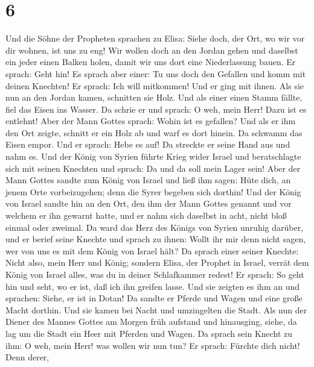 \hypertarget{section-5}{%
\section{6}\label{section-5}}

 Und die Söhne der Propheten sprachen zu Elisa: Siehe
doch, der Ort, wo wir vor dir wohnen, ist uns zu eng!  Wir
wollen doch an den Jordan gehen und daselbst ein jeder einen Balken
holen, damit wir uns dort eine Niederlassung bauen.  Er
sprach: Geht hin! Es sprach aber einer: Tu uns doch den Gefallen und
komm mit deinen Knechten!  Er sprach: Ich will mitkommen!
Und er ging mit ihnen. Als sie nun an den Jordan kamen, schnitten sie
Holz.  Und als einer einen Stamm fällte, fiel das Eisen
ins Wasser. Da schrie er und sprach: O weh, mein Herr! Dazu ist es
entlehnt!  Aber der Mann Gottes sprach: Wohin ist es
gefallen? Und als er ihm den Ort zeigte, schnitt er ein Holz ab und warf
es dort hinein. Da schwamm das Eisen empor.  Und er
sprach: Hebe es auf! Da streckte er seine Hand aus und nahm es.
 Und der König von Syrien führte Krieg wider Israel und
beratschlagte sich mit seinen Knechten und sprach: Da und da soll mein
Lager sein!  Aber der Mann Gottes sandte zum König von
Israel und ließ ihm sagen: Hüte dich, an jenem Orte vorbeizugehen; denn
die Syrer begeben sich dorthin!  Und der König von Israel
sandte hin an den Ort, den ihm der Mann Gottes genannt und vor welchem
er ihn gewarnt hatte, und er nahm sich daselbst in acht, nicht bloß
einmal oder zweimal.  Da ward das Herz des Königs von
Syrien unruhig darüber, und er berief seine Knechte und sprach zu ihnen:
Wollt ihr mir denn nicht sagen, wer von uns es mit dem König von Israel
hält?  Da sprach einer seiner Knechte: Nicht also, mein
Herr und König; sondern Elisa, der Prophet in Israel, verrät dem König
von Israel alles, was du in deiner Schlafkammer redest! 
Er sprach: So geht hin und seht, wo er ist, daß ich ihn greifen lasse.
Und sie zeigten es ihm an und sprachen: Siehe, er ist in Dotan!
 Da sandte er Pferde und Wagen und eine große Macht
dorthin. Und sie kamen bei Nacht und umzingelten die Stadt.
 Als nun der Diener des Mannes Gottes am Morgen früh
aufstand und hinausging, siehe, da lag um die Stadt ein Heer mit Pferden
und Wagen. Da sprach sein Knecht zu ihm: O weh, mein Herr! was wollen
wir nun tun?  Er sprach: Fürchte dich nicht! Denn derer,
